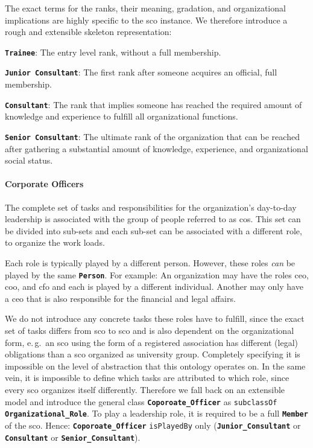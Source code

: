 \documentclass[a4paper, DIV=13, BCOR=0cm]{scrbook}
\newcommand{\eg}{e.\,g.\ }
\newcommand{\class}[1]{\texttt{\textbf{#1}}}
\newcommand{\relation}[1]{\texttt{#1}}
\begin{document}
The exact terms for the ranks, their meaning, gradation, and organizational implications are highly specific to the \gls{sco} instance. We therefore introduce a rough and extensible skeleton representation:
\begin{compactenum}
	\item \class{Trainee}: The entry level rank, without a full membership.
	\item \class{Junior Consultant}: The first rank after someone acquires an official, full membership.
	\item \class{Consultant}: The rank that implies someone has reached the required amount of knowledge and experience to fulfill all organizational functions.
	\item \class{Senior Consultant}: The ultimate rank of the organization that can be reached after gathering a substantial amount of knowledge, experience, and organizational social status.
\end{compactenum}

\paragraph{Corporate Officers}
The complete set of tasks and responsibilities for the organization's day-to-day leadership is associated with the group of people referred to as \glspl{co}. This set can be divided into sub-sets and each sub-set can be associated with a different role, to organize the work loads.

Each role is typically played by a different person. However, these roles \textit{can} be played by the same \class{Person}. For example: An organization may have the roles \gls{ceo}, \gls{coo}, and \gls{cfo} and each is played by a different individual. Another may only have a \gls{ceo} that is also responsible for the financial and legal affairs.

We do not introduce any concrete tasks these roles have to fulfill, since the exact set of tasks differs from \gls{sco} to \gls{sco} and is also dependent on the organizational form, \eg an \gls{sco} using the form of a registered association has different (legal) obligations than a \gls{sco} organized as university group. Completely specifying it is  impossible on the level of abstraction that this ontology operates on. In the same vein, it is impossible to define which tasks are attributed to which role, since every \gls{sco} organizes itself differently. Therefore we fall back on an extensible model and introduce the general class \class{Coporoate\_Officer} as \relation{subclassOf} \class{Organizational\_Role}. To play a leadership role, it is required to be a full \class{Member} of the \gls{sco}. Hence: \class{Coporoate\_Officer} \relation{isPlayedBy} only (\class{Junior\_Consultant} or \class{Consultant} or \class{Senior\_Consultant}).
\end{document}
